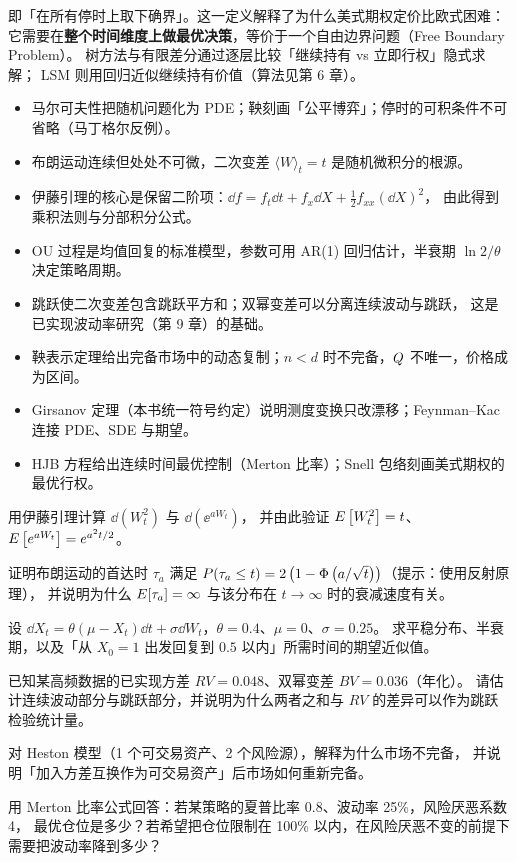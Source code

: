 即「在所有停时上取下确界」。这一定义解释了为什么美式期权定价比欧式困难：
它需要在\textbf{整个时间维度上做最优决策}，等价于一个自由边界问题（Free Boundary Problem）。
树方法与有限差分通过逐层比较「继续持有 vs 立即行权」隐式求解；
LSM 则用回归近似继续持有价值（算法见第 6 章）。

\begin{summarybox}
\begin{itemize}[leftmargin=1.4em]
  \item 马尔可夫性把随机问题化为 PDE；鞅刻画「公平博弈」；停时的可积条件不可省略（马丁格尔反例）。
  \item 布朗运动连续但处处不可微，二次变差 $\langle W\rangle_t=t$ 是随机微积分的根源。
  \item 伊藤引理的核心是保留二阶项：$\dd f=f_t\dd t+f_x\dd X+\frac12f_{xx}(\dd X)^2$，
        由此得到乘积法则与分部积分公式。
  \item OU 过程是均值回复的标准模型，参数可用 AR(1) 回归估计，半衰期 $\ln2/\theta$ 决定策略周期。
  \item 跳跃使二次变差包含跳跃平方和；双幂变差可以分离连续波动与跳跃，
        这是已实现波动率研究（第 9 章）的基础。
  \item 鞅表示定理给出完备市场中的动态复制；$n<d$ 时不完备，$Q$ 不唯一，价格成为区间。
  \item Girsanov 定理（本书统一符号约定）说明测度变换只改漂移；Feynman--Kac 连接 PDE、SDE 与期望。
  \item HJB 方程给出连续时间最优控制（Merton 比率）；Snell 包络刻画美式期权的最优行权。
\end{itemize}
\end{summarybox}

\begin{exercises}
\item 用伊藤引理计算 $\dd\left(W_t^{2}\right)$ 与 $\dd\left(\ee^{aW_t}\right)$，
并由此验证 $E\left[W_t^{2}\right]=t$、$E\left[e^{aW_t}\right]=e^{a^2t/2}$。

\item 证明布朗运动的首达时 $\tau_a$ 满足 $P(\tau_a\le t)=2\left(1-\Phi\left(a/\sqrt{t}\right)\right)$（提示：使用反射原理），
并说明为什么 $E[\tau_a]=\infty$ 与该分布在 $t\to\infty$ 时的衰减速度有关。

\item 设 $\dd X_t=\theta(\mu-X_t)\dd t+\sigma\dd W_t$，$\theta=0.4$、$\mu=0$、$\sigma=0.25$。
求平稳分布、半衰期，以及「从 $X_0=1$ 出发回复到 $0.5$ 以内」所需时间的期望近似值。

\item 已知某高频数据的已实现方差 $RV=0.048$、双幂变差 $BV=0.036$（年化）。
请估计连续波动部分与跳跃部分，并说明为什么两者之和与 $RV$ 的差异可以作为跳跃检验统计量。

\item 对 Heston 模型（1 个可交易资产、2 个风险源），解释为什么市场不完备，
并说明「加入方差互换作为可交易资产」后市场如何重新完备。

\item 用 Merton 比率公式回答：若某策略的夏普比率 0.8、波动率 25\%，风险厌恶系数 4，
最优仓位是多少？若希望把仓位限制在 100\% 以内，在风险厌恶不变的前提下需要把波动率降到多少？
\end{exercises}

